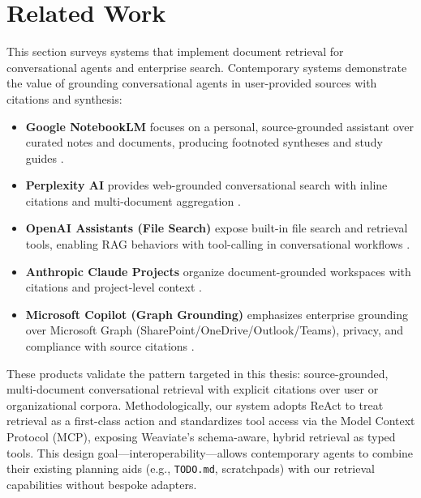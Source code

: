 \section{Related Work}
This section surveys systems that implement document retrieval for conversational agents and enterprise search. Contemporary systems demonstrate the value of grounding conversational agents in user-provided sources with citations and synthesis:
\begin{itemize}
    \item \textbf{Google NotebookLM} focuses on a personal, source-grounded assistant over curated notes and documents, producing footnoted syntheses and study guides \cite{notebooklm}.
    \item \textbf{Perplexity AI} provides web-grounded conversational search with inline citations and multi-document aggregation \cite{perplexity}.
    \item \textbf{OpenAI Assistants (File Search)} expose built-in file search and retrieval tools, enabling RAG behaviors with tool-calling in conversational workflows \cite{openai-assistants-file-search}.
    \item \textbf{Anthropic Claude Projects} organize document-grounded workspaces with citations and project-level context \cite{anthropic-projects}.
    \item \textbf{Microsoft Copilot (Graph Grounding)} emphasizes enterprise grounding over Microsoft Graph (SharePoint/OneDrive/Outlook/Teams), privacy, and compliance with source citations \cite{ms-copilot-graph}.
\end{itemize}

These products validate the pattern targeted in this thesis: source-grounded, multi-document conversational retrieval with explicit citations over user or organizational corpora. Methodologically, our system adopts ReAct to treat retrieval as a first-class action and standardizes tool access via the Model Context Protocol (MCP), exposing Weaviate's schema-aware, hybrid retrieval as typed tools. This design goal—interoperability—allows contemporary agents to combine their existing planning aids (e.g., \texttt{TODO.md}, scratchpads) with our retrieval capabilities without bespoke adapters.

